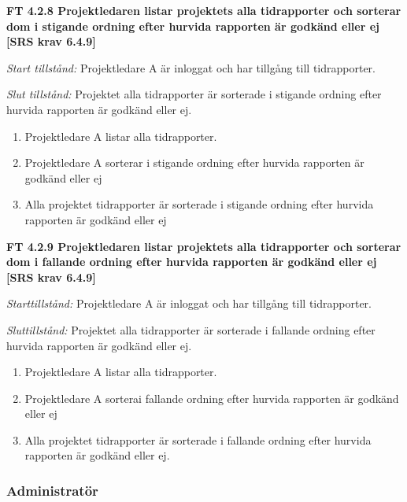 \documentclass[a4paper]{article}
\begin{document}
\textbf{FT 4.2.8 Projektledaren listar projektets alla tidrapporter och sorterar dom i stigande ordning efter hurvida rapporten är godkänd eller ej [SRS krav 6.4.9]}

\emph{Start tillstånd:} Projektledare A är inloggat och har tillgång till tidrapporter.

\emph{Slut tillstånd:} Projektet alla tidrapporter är sorterade i stigande ordning efter hurvida rapporten är godkänd eller ej.

\begin{enumerate}
\item Projektledare A listar alla tidrapporter.
\item Projektledare A sorterar i stigande ordning efter hurvida rapporten är godkänd eller ej
\item Alla projektet tidrapporter är sorterade i stigande ordning efter hurvida rapporten är godkänd eller ej
\end{enumerate}

\textbf{FT 4.2.9 Projektledaren listar projektets alla tidrapporter och sorterar dom i fallande ordning efter hurvida rapporten är godkänd eller ej [SRS krav 6.4.9]}

\emph{Starttillstånd:} Projektledare A är inloggat och har tillgång till tidrapporter.

\emph{Sluttillstånd:} Projektet alla tidrapporter är sorterade i fallande ordning efter hurvida rapporten är godkänd eller ej.

\begin{enumerate}
\item Projektledare A listar alla tidrapporter.
\item Projektledare A sorterai fallande ordning efter hurvida rapporten är godkänd eller ej
\item Alla projektet tidrapporter är sorterade i fallande ordning efter hurvida rapporten är godkänd eller ej.
\end{enumerate}

























\subsubsection{Administratör}
\end{document}
